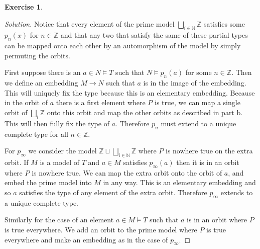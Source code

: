 \documentclass{article}
\renewcommand{\qedsymbol}{\raisebox{-0.5cm}{}}
\newcommand{\N}{\mathbb{N}}
\newcommand{\Z}{\mathbb{Z}}
\newenvironment{solution}{\begin{proof}[Solution]\renewcommand\qedsymbol{}}{\end{proof}}
\theoremstyle{definition}
\newtheorem{question}{Exercise}
\begin{document}
\begin{question}
\begin{enumerate}[(1)]
\begin{solution}
                  Notice that every element of the prime model
                  \(\bigsqcup_{i\in\N}\Z\) satisfies some \(p_{n}(x)\) for
                  \(n\in\Z\) and that any two that satisfy the same of these
                  partial types can be mapped onto each other by an automorphism
                  of the model by simply permuting the orbits.

                  First suppose there is an \(a\in N\models T\) such that
                  \(N\models p_{n}(a)\) for some \(n\in\Z\). Then we define an
                  embedding \(M\to N\) such that \(a\) is in the image of the
                  embedding. This will uniquely fix the type because this is an
                  elementary embedding. Because in the orbit of \(a\) there is a
                  first element where \(P\) is true, we can map a single orbit
                  of \(\bigsqcup_{i}\Z\) onto this orbit and map the other
                  orbits as described in part b. This will then fully fix the
                  type of \(a\). Therefore \(p_{n}\) must extend to a unique
                  complete type for all \(n\in\Z\).

                  For \(p_{\infty}\) we consider the model
                  \(\Z\sqcup\bigsqcup_{i\in\N}\Z\) where \(P\) is nowhere true
                  on the extra orbit. If \(M\) is a model of \(T\) and \(a\in
                  M\) satisfies \(p_{\infty}(a)\) then it is in an orbit where
                  \(P\) is nowhere true. We can map the extra orbit onto the
                  orbit of \(a\), and embed the prime model into \(M\) in any
                  way. This is an elementary embedding and so \(a\) satisfies
                  the type of any element of the extra orbit. Therefore
                  \(p_{\infty}\) extends to a unique complete type.

                  Similarly for the case of an element \(a\in M\models T\) such
                  that \(a\) is in an orbit where \(P\) is true everywhere. We
                  add an orbit to the prime model where \(P\) is true everywhere
                  and make an embedding as in the case of \(p_{\infty}\).
              \end{solution}
    \end{enumerate}
\end{question}
\end{document}
